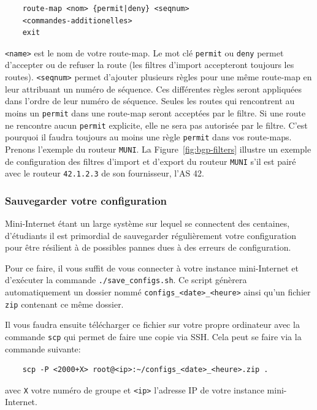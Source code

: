 \documentclass[a4paper, 11pt]{article}
\begin{document}
\begin{verbatim}
    route-map <nom> {permit|deny} <seqnum>
    <commandes-additionelles>
    exit
\end{verbatim}
\texttt{<name>} est le nom de votre route-map. Le mot clé \texttt{permit}
ou \texttt{deny} permet d'accepter ou de refuser la route (les
filtres d'import accepteront toujours les routes). \texttt{<seqnum>}
permet d'ajouter plusieurs règles pour une même route-map en leur attribuant un
numéro de séquence. Ces différentes
règles seront appliquées dans l'ordre de leur numéro de séquence. Seules
les routes qui rencontrent au moins un \texttt{permit} dans une route-map
seront acceptées par le filtre.
Si une route ne rencontre aucun \texttt{permit} explicite, elle ne sera
pas autorisée par le filtre. C'est pourquoi il faudra toujours au moins une
règle \texttt{permit} dans vos route-maps. Prenons l'exemple du routeur
\texttt{MUNI}. La Figure~\ref{fig:bgp-filters} illustre un exemple
de configuration des filtres d'import et d'export du routeur \texttt{MUNI}
s'il est pairé avec le routeur \texttt{42.1.2.3} de son fournisseur, l'AS 42.


\subsubsection{Sauvegarder votre configuration}

Mini-Internet étant un large système sur lequel se connectent des centaines,
d'étudiants il est primordial de sauvegarder régulièrement votre configuration
pour être résilient à de possibles pannes dues à des erreurs de configuration.

Pour ce faire, il vous suffit de vous connecter à votre instance mini-Internet
et d'exécuter la commande \texttt{./save\_configs.sh}. Ce script génèrera
automatiquement un dossier nommé \texttt{configs\_<date>\_<heure>} ainsi
qu'un fichier \texttt{zip} contenant ce même dossier.

Il vous faudra ensuite télécharger ce fichier sur votre propre ordinateur avec
la commande \texttt{scp} qui permet de faire une copie via SSH. Cela peut se faire
via la commande suivante:


\begin{verbatim}
    scp -P <2000+X> root@<ip>:~/configs_<date>_<heure>.zip .
\end{verbatim}

avec \texttt{X} votre numéro de groupe et \texttt{<ip>} l'adresse IP de votre
instance mini-Internet.
\end{document}
